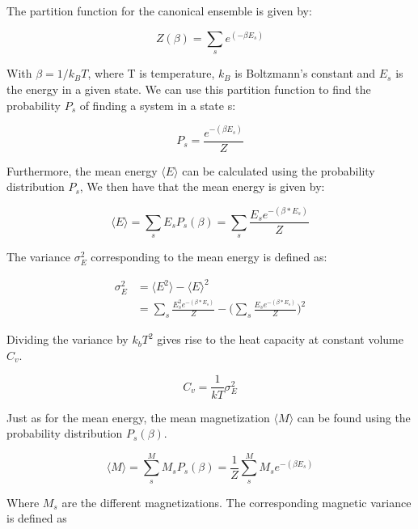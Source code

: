 \documentclass{article}
\begin{document}
\begin{multicols}{2}
The partition function for the canonical ensemble is given by:

\begin{equation}
Z(\beta) = \sum_{s} e^{(-\beta E_s)}
\label{eq:Z}
\end{equation}

With $\beta=1/k_BT$, where T is temperature, $k_B$ is Boltzmann's constant and $E_s$ is the energy in a given state. We can use this partition function to find the probability $P_s$ of finding a system in a state s:

\begin{equation}
P_s=\frac{e^{-(\beta E_s)}}{Z}
\label{eq:P_s}
\end{equation}

Furthermore, the mean energy $\langle E \rangle$ can be calculated using the probability distribution $P_s$, We then have that the mean energy  is given by:

\begin{equation}
\langle E \rangle = \sum_s E_s P_s(\beta)  = \sum_s \frac{E_s e^{-(\beta*E_s)}}{Z}
\label{eq:E_m}
\end{equation}

The variance $\sigma_E^2$ corresponding to the mean energy is defined as:

\begin{equation}
\begin{split}
\sigma_E^2 &= \langle E^2 \rangle - \langle E \rangle^2 \\
&= \sum_s \frac{E_s^2 e^{-(\beta*E_s)}}{Z} - \bigg(\sum_s \frac{E_s e^{-(\beta*E_s)}}{Z}\bigg)^2
\end{split}
\label{eq:E_v}
\end{equation}

Dividing the variance by $k_bT^2$ gives rise to the heat capacity at constant volume $C_v$.

\begin{equation}
C_v = \frac{1}{kT} \sigma_E^2 
\label{eq:C_v}
\end{equation}

Just as for the mean energy, the mean magnetization $\langle M \rangle$ can be found using the probability distribution $P_s(\beta)$.

\begin{equation}
\langle M \rangle=\sum_s^M M_s P_s(\beta)=\frac{1}{Z}\sum_s^M M_s e^{-(\beta E_s)}
\label{eq:mM}
\end{equation}

Where $M_s$ are the different magnetizations. The corresponding magnetic variance is defined as


\end{multicols}
\end{document}

